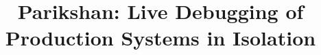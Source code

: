 \documentclass[letterpaper,twocolumn,10pt]{article}
\begin{document}

\title{\Large \bf Parikshan\xspace: Live Debugging of Production Systems in Isolation}


\maketitle




\newcommand{\iprobe}{\texttt{iProbe}\xspace}
\newcommand{\parikshan}{\texttt{Parikshan}\xspace}
\newcommand{\comment}[1]{}
\newtheorem{example}{Example}
\def\infinity{\rotatebox{90}{8}}



%
%


%
%




%



%
%

\footnotesize{


}

\end{document}
